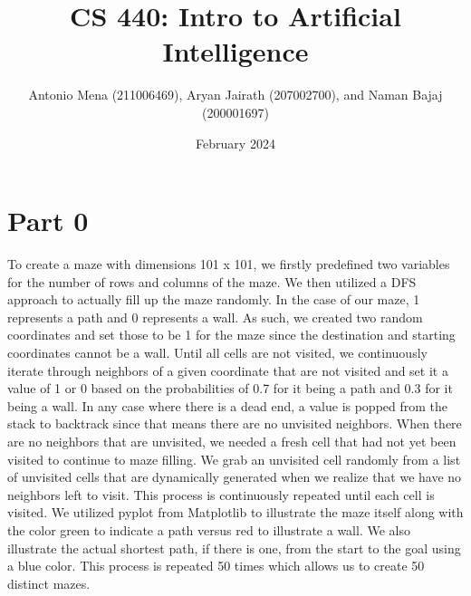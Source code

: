\documentclass{article}
\title{CS 440: Intro to Artificial Intelligence}
\author{Antonio Mena (211006469), Aryan Jairath (207002700), and Naman Bajaj (200001697)}
\date{February 2024}
\begin{document}
\maketitle

\newpage
\section*{Part 0}
To create a maze with dimensions 101 x 101, we firstly predefined two variables for the number of rows and columns of the maze. We then utilized a DFS approach to actually fill up the maze randomly. In the case of our maze, 1 represents a path and 0 represents a wall. As such, we created two random coordinates and set those to be 1 for the maze since the destination and starting coordinates cannot be a wall. Until all cells are not visited, we continuously iterate through neighbors of a given coordinate that are not visited and set it a value of 1 or 0 based on the probabilities of 0.7 for it being a path and 0.3 for it being a wall. In any case where there is a dead end, a value is popped from the stack to backtrack since that means there are no unvisited neighbors. When there are no neighbors that are unvisited, we needed a fresh cell that had not yet been visited to continue to maze filling. We grab an unvisited cell randomly from a list of unvisited cells that are dynamically generated when we realize that we have no neighbors left to visit. This process is continuously repeated until each cell is visited. We utilized pyplot from Matplotlib to illustrate the maze itself along with the color green to indicate a path versus red to illustrate a wall. We also illustrate the actual shortest path, if there is one, from the start to the goal using a blue color. This process is repeated 50 times which allows us to create 50 distinct mazes.
\end{document}
